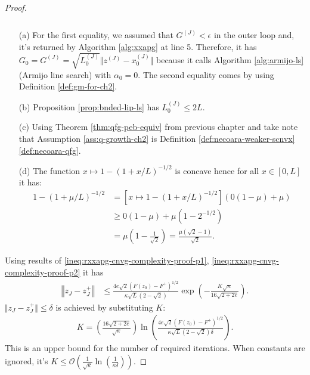 \documentclass[12pt]{report}
\begin{document}
\begin{proof}
{\begin{align}
\begin{split}
                \end{split}
                \label{ineq:rxxapg-cnvg-complexity-proof-p2}
            \end{align}
            }
            \begin{enumerate}
                \item [(a)] For the first equality, we assumed that $G^{(J)} < \epsilon$ in the outer loop and, it's returned by Algorithm \ref{alg:xxapg} at line 5. Therefore, it has $G_0 = G^{(J)} = \sqrt{L^{(J)}_0} \Vert z^{(J)} - x_0^{(J)}\Vert$ because it calls Algorithm \ref{alg:armijo-ls} (Armijo line search) with $\alpha_0 = 0$. The second equality comes by using Definition \ref{def:gm-for-ch2}. 
                \item [(b)] Proposition \ref{prop:bnded-lip-ls} has $L_0^{(J)} \le 2L$. 
                \item [(c)] Using Theorem \ref{thm:qfg-peb-equiv} from previous chapter and take note that Assumption \ref{ass:q-growth-ch2} is Definition \ref{def:necoara-weaker-scnvx}\ref{def:necoara-qfg}. 
                \item [(d)] The function $x \mapsto 1 - (1 + x/L)^{-1/2}$ is concave hence for all $x \in [0, L]$ it has: 
                \begin{align*}
                    1 - (1 + \mu/L)^{-1/2} &= \left[x \mapsto 1 - (1 + x/L)^{-1/2}\right](0(1 - \mu) + \mu)
                    \\
                    &\ge 0(1 - \mu) + \mu(1 - 2^{-1/2}) 
                    \\
                    &= \mu\left(
                        1 - \frac{1}{\sqrt{2}}
                    \right) = \frac{\mu(\sqrt{2} - 1)}{\sqrt{2}}. 
                \end{align*}
            \end{enumerate}
            Using results of \eqref{ineq:rxxapg-cnvg-complexity-proof-p1}, \eqref{ineq:rxxapg-cnvg-complexity-proof-p2} it has
            \begin{align*}
                \left\Vert z_J - z^+_J\right\Vert 
                &\le 
                \frac{4e\sqrt{2}(F(z_0) - F^+)^{1/2}}{\kappa\sqrt{L}(2 - \sqrt{2})} 
                \exp\left(
                    -\frac{K\sqrt{\kappa}}{16\sqrt{2 + 2e}}
                \right). 
            \end{align*}
            $\Vert z_J - z^+_J\Vert \le \delta$ is achieved by substituting $K$: 
            \begin{align*}
                K = \left(
                    \frac{16\sqrt{2 + 2e}}{\sqrt{\kappa}}
                \right)
                \ln \left(
                    \frac{4e\sqrt{2}(F(z_0) - F^+)^{1/2}}{\kappa \sqrt{L}(2 - \sqrt{2})\delta}
                \right). 
            \end{align*}
            This is an upper bound for the number of required iterations. 
            When constants are ignored, it's $K \le \mathcal O\left(\frac{1}{\sqrt{\kappa}}\ln\left(\frac{1}{\kappa\delta}\right)\right)$. 
        \end{proof}
\end{document}
